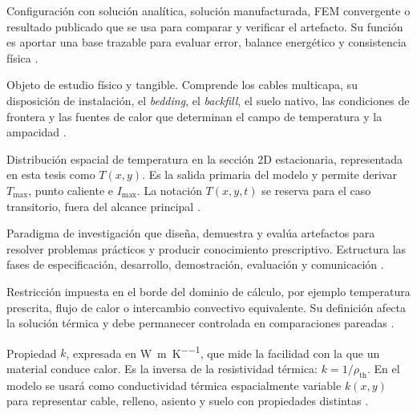 \documentclass[11pt,a4paper,oneside]{report}
\newcommand{\Tmax}{T_{\max}}
\newcommand{\Imax}{I_{\max}}
\newcommand{\kx}{k(x,y)}
\newcommand{\rhoth}{\rho_{\mathrm{th}}}
\begin{document}
\begin{description}[style=nextline,itemsep=0.5\baselineskip,parsep=0pt,topsep=0.25\baselineskip]
  \item[Caso de referencia o \textit{benchmark}.] Configuración con solución analítica, solución manufacturada, FEM convergente o resultado publicado que se usa para comparar y verificar el artefacto. Su función es aportar una base trazable para evaluar error, balance energético y consistencia física \parencites{cigre2022}[93--99]{cigre2025}.

  \item[Arreglo de cables--entorno térmico.] Objeto de estudio físico y tangible. Comprende los cables multicapa, su disposición de instalación, el \textit{bedding}, el \textit{backfill}, el suelo nativo, las condiciones de frontera y las fuentes de calor que determinan el campo de temperatura y la ampacidad \parencites[752--760]{neher1957}{anders2005}[3--5]{enescu2020}[4--6]{enescu2021}[1,10,16]{kim2025}.

  \item[Campo de temperatura.] Distribución espacial de temperatura en la sección 2D estacionaria, representada en esta tesis como $T(x,y)$. Es la salida primaria del modelo y permite derivar $\Tmax$, punto caliente e $\Imax$. La notación $T(x,y,t)$ se reserva para el caso transitorio, fuera del alcance principal \parencites{carslaw1959conduction,kakac2018heatConduction,hahn2012heatConduction}[1,3,16]{pan2025}.

  \item[Ciencia del diseño o DSR.] Paradigma de investigación que diseña, demuestra y evalúa artefactos para resolver problemas prácticos y producir conocimiento prescriptivo. Estructura las fases de especificación, desarrollo, demostración, evaluación y comunicación \parencites[54--56]{peffers2007}[342--351]{gregor2013}[198--203]{delport2024}.

  \item[Condición de contorno.] Restricción impuesta en el borde del dominio de cálculo, por ejemplo temperatura prescrita, flujo de calor o intercambio convectivo equivalente. Su definición afecta la solución térmica y debe permanecer controlada en comparaciones pareadas \parencites{carslaw1959conduction,kakac2018heatConduction,hahn2012heatConduction}[3--5]{enescu2020}[3--4,93--99]{cigre2025}.

  \item[Conductividad térmica.] Propiedad $k$, expresada en \si{\watt\per\metre\per\kelvin}, que mide la facilidad con la que un material conduce calor. Es la inversa de la resistividad térmica: $k=1/\rhoth$. En el modelo se usará como conductividad térmica espacialmente variable $\kx$ para representar cable, relleno, asiento y suelo con propiedades distintas \parencites{carslaw1959conduction,kakac2018heatConduction}{farouki1981thermal,devries1966thermal}[1,7]{khumalo2025}[secciones 4--6]{ieee442}.


\end{description}
\end{document}
